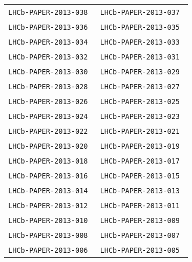 \begin{center}
\begin{longtable}{ll}
\texttt{LHCb-PAPER-2013-038}~\cite{LHCb-PAPER-2013-038} &
\texttt{LHCb-PAPER-2013-037}~\cite{LHCb-PAPER-2013-037} \\
\texttt{LHCb-PAPER-2013-036}~\cite{LHCb-PAPER-2013-036} &
\texttt{LHCb-PAPER-2013-035}~\cite{LHCb-PAPER-2013-035} \\
\texttt{LHCb-PAPER-2013-034}~\cite{LHCb-PAPER-2013-034} &
\texttt{LHCb-PAPER-2013-033}~\cite{LHCb-PAPER-2013-033} \\
\texttt{LHCb-PAPER-2013-032}~\cite{LHCb-PAPER-2013-032} &
\texttt{LHCb-PAPER-2013-031}~\cite{LHCb-PAPER-2013-031} \\
\texttt{LHCb-PAPER-2013-030}~\cite{LHCb-PAPER-2013-030} &
\texttt{LHCb-PAPER-2013-029}~\cite{LHCb-PAPER-2013-029} \\
\texttt{LHCb-PAPER-2013-028}~\cite{LHCb-PAPER-2013-028} &
\texttt{LHCb-PAPER-2013-027}~\cite{LHCb-PAPER-2013-027} \\
\texttt{LHCb-PAPER-2013-026}~\cite{LHCb-PAPER-2013-026} &
\texttt{LHCb-PAPER-2013-025}~\cite{LHCb-PAPER-2013-025} \\
\texttt{LHCb-PAPER-2013-024}~\cite{LHCb-PAPER-2013-024} &
\texttt{LHCb-PAPER-2013-023}~\cite{LHCb-PAPER-2013-023} \\
\texttt{LHCb-PAPER-2013-022}~\cite{LHCb-PAPER-2013-022} &
\texttt{LHCb-PAPER-2013-021}~\cite{LHCb-PAPER-2013-021} \\
\texttt{LHCb-PAPER-2013-020}~\cite{LHCb-PAPER-2013-020} &
\texttt{LHCb-PAPER-2013-019}~\cite{LHCb-PAPER-2013-019} \\
\texttt{LHCb-PAPER-2013-018}~\cite{LHCb-PAPER-2013-018} &
\texttt{LHCb-PAPER-2013-017}~\cite{LHCb-PAPER-2013-017} \\
\texttt{LHCb-PAPER-2013-016}~\cite{LHCb-PAPER-2013-016} &
\texttt{LHCb-PAPER-2013-015}~\cite{LHCb-PAPER-2013-015} \\
\texttt{LHCb-PAPER-2013-014}~\cite{LHCb-PAPER-2013-014} &
\texttt{LHCb-PAPER-2013-013}~\cite{LHCb-PAPER-2013-013} \\
\texttt{LHCb-PAPER-2013-012}~\cite{LHCb-PAPER-2013-012} &
\texttt{LHCb-PAPER-2013-011}~\cite{LHCb-PAPER-2013-011} \\
\texttt{LHCb-PAPER-2013-010}~\cite{LHCb-PAPER-2013-010} &
\texttt{LHCb-PAPER-2013-009}~\cite{LHCb-PAPER-2013-009} \\
\texttt{LHCb-PAPER-2013-008}~\cite{LHCb-PAPER-2013-008} &
\texttt{LHCb-PAPER-2013-007}~\cite{LHCb-PAPER-2013-007} \\
\texttt{LHCb-PAPER-2013-006}~\cite{LHCb-PAPER-2013-006} &
\texttt{LHCb-PAPER-2013-005}~\cite{LHCb-PAPER-2013-005} \\

\end{longtable}
\end{center}
